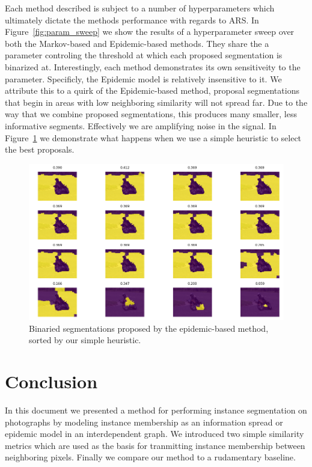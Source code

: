 \documentclass[twocolumn]{article}
\newcommand{\figref}[1]{Figure~\ref{fig:#1}}
\newcommand{\figlab}[1]{\label{fig:#1}}
\begin{document}
Each method described is subject to a number of hyperparameters which ultimately 
dictate the methods performance with regards to ARS. In \figref{param_sweep} we
show the results of a hyperparameter sweep over both the Markov-based and
Epidemic-based methods. They share the a parameter controling the threshold at
which each proposed segmentation is binarized at. Interestingly, each method
demonstrates its own sensitiveity to the parameter. Specificly, the Epidemic
model is relatively insensitive to it. We attribute this to a quirk of the
Epidemic-based method, proposal segmentations that begin in areas with low
neighboring similarity will not spread far. Due to the way that we combine
proposed segmentations, this produces many smaller, less informative segments.
Effectively we are amplifying noise in the signal. In \figref{epidemic_only} we
demonstrate what happens when we use a simple heuristic to select the best
proposals.

\begin{figure}[t]
    \includegraphics[width=\linewidth]{figs/epidemic_heuristic.png}
    \caption{Binaried segmentations proposed by the epidemic-based method,
    sorted by our simple heuristic.}
    \figlab{epidemic_only}
\end{figure}

\section{Conclusion}

In this document we presented a method for performing instance segmentation on
photographs by modeling instance membership as an information spread or epidemic
model in an interdependent graph. We introduced two simple similarity metrics
which are used as the basis for tranmitting instance membership between
neighboring pixels. Finally we compare our method to a rudamentary baseline.
\end{document}
